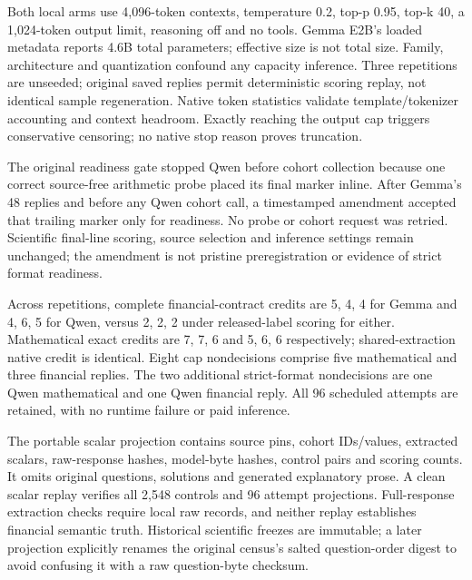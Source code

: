 Both local arms use 4,096-token contexts, temperature 0.2, top-p 0.95, top-k 40, a 1,024-token output limit, reasoning off and no tools. Gemma E2B's loaded metadata reports 4.6B total parameters; effective size is not total size. Family, architecture and quantization confound any capacity inference. Three repetitions are unseeded; original saved replies permit deterministic scoring replay, not identical sample regeneration. Native token statistics validate template/tokenizer accounting and context headroom. Exactly reaching the output cap triggers conservative censoring; no native stop reason proves truncation.

The original readiness gate stopped Qwen before cohort collection because one correct source-free arithmetic probe placed its final marker inline. After Gemma's 48 replies and before any Qwen cohort call, a timestamped amendment accepted that trailing marker only for readiness. No probe or cohort request was retried. Scientific final-line scoring, source selection and inference settings remain unchanged; the amendment is not pristine preregistration or evidence of strict format readiness.

Across repetitions, complete financial-contract credits are 5, 4, 4 for Gemma and 4, 6, 5 for Qwen, versus 2, 2, 2 under released-label scoring for either. Mathematical exact credits are 7, 7, 6 and 5, 6, 6 respectively; shared-extraction native credit is identical. Eight cap nondecisions comprise five mathematical and three financial replies. The two additional strict-format nondecisions are one Qwen mathematical and one Qwen financial reply. All 96 scheduled attempts are retained, with no runtime failure or paid inference.

The portable scalar projection contains source pins, cohort IDs/values, extracted scalars, raw-response hashes, model-byte hashes, control pairs and scoring counts. It omits original questions, solutions and generated explanatory prose. A clean scalar replay verifies all 2,548 controls and 96 attempt projections. Full-response extraction checks require local raw records, and neither replay establishes financial semantic truth. Historical scientific freezes are immutable; a later projection explicitly renames the original census's salted question-order digest to avoid confusing it with a raw question-byte checksum.

